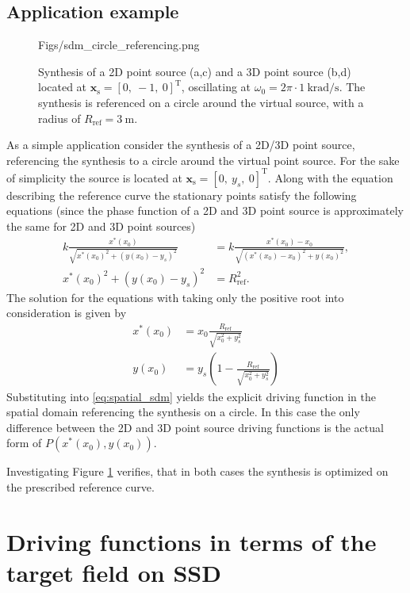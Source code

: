 \documentclass[12pt,a4paper]{article}
\newcommand{\vxs}{\mathbf{x}_{\mathrm{s}}}
\begin{document}
\subsection{Application example}
\begin{figure}
	\centering
	\begin{overpic}[width = .95\columnwidth ]{Figs/sdm_circle_referencing.png}
	\scriptsize
	\end{overpic}
	\caption{Synthesis of a 2D point source (a,c) and a 3D point source (b,d) located at $\vxs = [0,\ -1,\ 0]^\mathrm{T}$, oscillating at $\omega_0 = 2\pi \cdot 1 ~\mathrm{krad/s}$. The synthesis is referenced on a circle around the virtual source, with a radius of $R_{\mathrm{ref}} = 3~\mathrm{m}$.}
	\label{fig:sdm_spatial_1}
\end{figure}
As a simple application consider the synthesis of a 2D/3D point source, referencing the synthesis to a circle around the virtual point source.
For the sake of simplicity the source is located at $\vxs = [0,\ y_s,\ 0]^{\mathrm{T}}$. Along with the equation describing the reference curve the stationary points satisfy the following equations (since the phase function of a 2D and 3D point source is approximately the same for 2D and 3D point sources)
\begin{align}
k \frac{x^*(x_0)}{\sqrt{x^*(x_0)^2 + (y(x_0)-y_s)^2}} &= k \frac{x^*(x_0)-x_0}{\sqrt{(x^*(x_0)-x_0)^2 + y(x_0)^2}}, \\
x^*(x_0)^2 + (y(x_0)-y_s)^2     &= R_{\mathrm{ref}}^2.
\end{align}
The solution for the equations with taking only the positive root into consideration is given by
\begin{align}
x^*(x_0) &= x_0 \frac{ R_{\mathrm{ref}}}{\sqrt{x_0^2 + y_s^2}} \\
y(x_0) 	 &= y_s \left( 1 -  \frac{R_{\mathrm{ref}}}{\sqrt{x_0^2 + y_s^2}}\right)
\end{align}
Substituting into \eqref{eq:spatial_sdm} yields the explicit driving function in the spatial domain referencing the synthesis on a circle.
In this case the only difference between the 2D and 3D point source driving functions is the actual form of $P(x^*(x_0),y(x_0))$.

Investigating Figure \ref{fig:sdm_spatial_1} verifies, that in both cases the synthesis is optimized on the prescribed reference curve.

\newpage
\section{Driving functions in terms of the target field on SSD}
\end{document}
